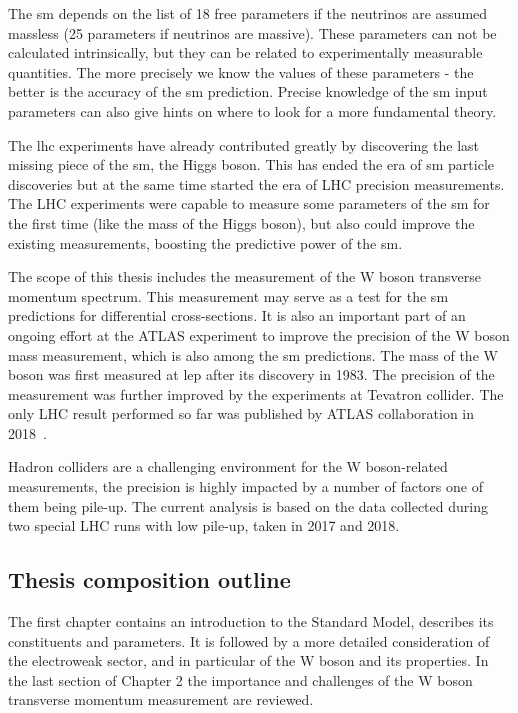 The \gls{sm} depends on the list of 18 free parameters if the neutrinos are assumed massless (25 parameters if neutrinos are massive). These parameters can not be calculated intrinsically, but they can be related to experimentally measurable quantities. The more precisely we know the values of these parameters - the better is the accuracy of the \gls{sm} prediction. Precise knowledge of the \gls{sm} input parameters can also give hints on where to look for a more fundamental theory. 

The \gls{lhc} experiments have already contributed greatly by discovering the last missing piece of the \gls{sm}, the Higgs boson. This has ended the era of \gls{sm} particle discoveries but at the same time started the era of LHC precision measurements. The LHC experiments were capable to measure some parameters of the \gls{sm} for the first time (like the mass of the Higgs boson), but also could improve the existing measurements, boosting the predictive power of the \gls{sm}. 

The scope of this thesis includes the measurement of the W boson transverse momentum spectrum. This measurement may serve as a test for the \gls{sm} predictions for differential cross-sections. It is also an important part of an ongoing effort at the ATLAS experiment to improve the precision of the W boson mass measurement, which is also among the \gls{sm} predictions. The mass of the W boson was first measured at \gls{lep} after its discovery in 1983. The precision of the measurement was further improved by the experiments at Tevatron collider. The only LHC result performed so far was published by ATLAS collaboration in 2018~\cite{wboson}.

Hadron colliders are a challenging environment for the W boson-related measurements, the precision is highly impacted by a number of factors one of them being pile-up. The current analysis is based on the data collected during two special LHC runs with low pile-up, taken in 2017 and 2018.  
\subsection{Thesis composition outline}
The first chapter contains an introduction to the Standard Model, describes its constituents and parameters. It is followed by a more detailed consideration of the electroweak sector, and in particular of the W boson and its properties. In the last section of Chapter 2 the importance and challenges of the W boson transverse momentum measurement are reviewed. 

